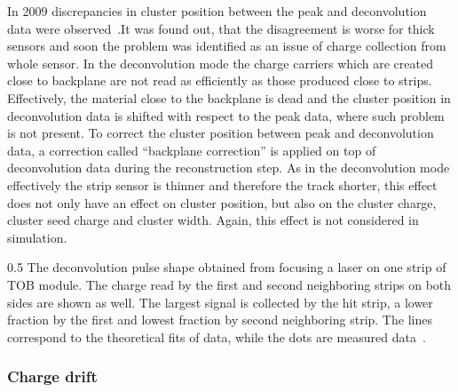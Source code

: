 In 2009 discrepancies in cluster position between the peak and deconvolution data were observed~\cite{website:backplane}.It was found out, that the disagreement is worse for thick sensors and soon the problem was identified as an issue of charge collection from whole sensor. In the deconvolution mode the charge carriers which are created close to backplane are not read as efficiently as those produced close to strips. Effectively, the material close to the backplane is dead and the cluster position in deconvolution data is shifted with respect to the peak data, where such problem is not present. To correct the cluster position between peak and deconvolution data, a correction called ``backplane correction'' is applied on top of deconvolution data during the reconstruction step. As in the deconvolution mode effectively the strip sensor is thinner and therefore the track shorter, this effect does not only have an effect on cluster position, but also on the cluster charge, cluster seed charge and cluster width. Again, this effect is not considered in simulation.


                 {0.5}       %
                 { The deconvolution pulse shape obtained from focusing a laser on one strip of TOB module. The charge read by the first and second neighboring strips on both sides are shown as well. The largest signal is collected by the hit strip, a lower fraction by the first and lowest fraction by second neighboring strip. The lines correspond to the theoretical fits of data, while the dots are measured data~\cite{Delaere:1061284}.  }


\subsubsection{Charge drift}

